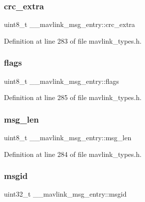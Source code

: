 \subsubsection{\texorpdfstring{crc\_extra}{crc\_extra}}
{\footnotesize\ttfamily uint8\+\_\+t \+\_\+\+\_\+mavlink\+\_\+msg\+\_\+entry\+::crc\+\_\+extra}



Definition at line 283 of file mavlink\+\_\+types.\+h.

\mbox{\label{struct____mavlink__msg__entry_a5dd6c81b1631f802139252c6032f0bf3}} 
\subsubsection{\texorpdfstring{flags}{flags}}
{\footnotesize\ttfamily uint8\+\_\+t \+\_\+\+\_\+mavlink\+\_\+msg\+\_\+entry\+::flags}



Definition at line 285 of file mavlink\+\_\+types.\+h.

\mbox{\label{struct____mavlink__msg__entry_a694a59ebf8db1111bdc87ae20e19e57d}} 
\subsubsection{\texorpdfstring{msg\_len}{msg\_len}}
{\footnotesize\ttfamily uint8\+\_\+t \+\_\+\+\_\+mavlink\+\_\+msg\+\_\+entry\+::msg\+\_\+len}



Definition at line 284 of file mavlink\+\_\+types.\+h.

\mbox{\label{struct____mavlink__msg__entry_a9febab81ee60dbd1a91a23a5515cad31}} 
\subsubsection{\texorpdfstring{msgid}{msgid}}
{\footnotesize\ttfamily uint32\+\_\+t \+\_\+\+\_\+mavlink\+\_\+msg\+\_\+entry\+::msgid}



